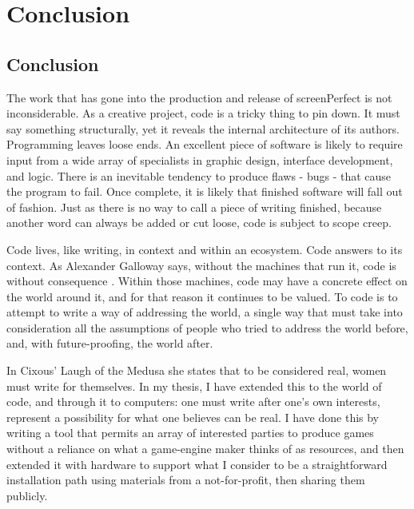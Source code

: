 
\chapter{Conclusion}\thispagestyle{empty} %

\label{Chapter5} %


\section{Conclusion}
The work that has gone into the production and release of screenPerfect is not inconsiderable. As a creative project, code is a tricky thing to pin down. It must say something structurally, yet it reveals the internal architecture of its authors. Programming leaves loose ends. An excellent piece of software is likely to require input from a wide array of specialists in graphic design, interface development, and logic. There is an inevitable tendency to produce flaws - bugs - that cause the program to fail. Once complete, it is likely that finished software will fall out of fashion. Just as there is no way to call a piece of writing finished, because another word can always be added or cut loose, code is subject to scope creep. 

Code lives, like writing, in context and within an ecosystem. Code answers to its context. As Alexander Galloway says, without the machines that run it, code is without consequence \cite{galloway}. Within those machines, code may have a concrete effect on the world around it, and for that reason it continues to be valued. To code is to attempt to write a way of addressing the world, a single way that must take into consideration all the assumptions of people who tried to address the world before, and, with future-proofing, the world after. 

In Cixous' Laugh of the Medusa \parencite{cixous} she states that to be considered real, women must write for themselves. In my thesis, I have extended this to the world of code, and through it to computers: one must write after one's own interests, represent a possibility for what one believes can be real. I have done this by writing a tool that permits an array of interested parties to produce games without a reliance on what a game-engine maker thinks of as resources, and then extended it with hardware to support what I consider to be a straightforward installation path using materials from a not-for-profit, then sharing them publicly.


